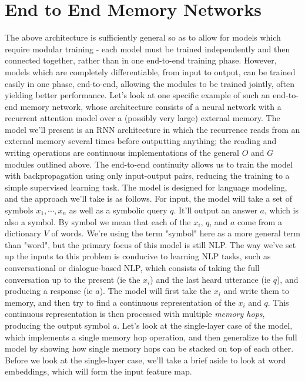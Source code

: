 \documentclass{article}
\begin{document}
\section{End to End Memory Networks}
The above architecture is sufficiently general so as to allow for models which require modular training - each model must be trained independently and then connected together, rather than in one end-to-end training phase. However, models which are completely differentiable, from input to output, can be trained easily in one phase, end-to-end, allowing the modules to be trained jointly, often yielding better performance. Let's look at one specific example of such an end-to-end memory network, whose architecture consists of a neural network with a recurrent attention model over a (possibly very large) external memory.
\newline
The model we'll present is an RNN architecture in which the recurrence reads from an external memory several times before outputting anything; the reading and writing operations are continuous implementations of the general $ O $ and $ G $ modules outlined above. The end-to-end continuity allows us to train the model with backpropagation using only input-output pairs, reducing the training to a simple supervised learning task. The model is designed for language modeling, and the approach we'll take is as follows.
\newline
For input, the model will take a set of symbols $ x_1, \cdots, x_n $ as well as a symbolic query $ q $. It'll output an answer $ a $, which is also a symbol. By symbol we mean that each of the $ x_i $, $ q $, and $ a $ come from a dictionary $ V $ of words. We're using the term "symbol" here as a more general term than "word", but the primary focus of this model is still NLP. The way we've set up the inputs to this problem is conducive to learning NLP tasks, such as conversational or dialogue-based NLP, which consists of taking the full conversation up to the present (ie the $ x_i $) and the last heard utterance (ie $ q $), and producing a response (ie $ a $). The model will first take the $ x_i $ and write them to memory, and then try to find a continuous representation of the $ x_i $ and $ q $. This continuous representation is then processed with multiple \textit{memory hops}, producing the output symbol $ a $. Let's look at the single-layer case of the model, which implements a single memory hop operation, and then generalize to the full model by showing how single memory hops can be stacked on top of each other. Before we look at the single-layer case, we'll take a brief aside to look at word embeddings, which will form the input feature map.
\end{document}
